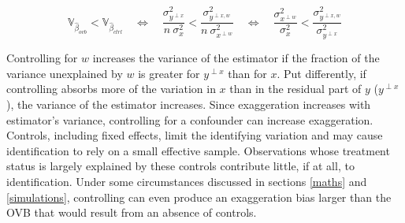 			\[
				\mathbb{V}_{\hat{\beta}_{ovb}} <  \mathbb{V}_{\hat{\beta}_{ctrl}}
                   		\quad \Leftrightarrow \quad 
				\dfrac{\sigma^{2}_{y^{\perp x}}}{n \ \sigma_{x}^{2}} < \dfrac{\sigma^{2}_{y^{\perp x, w}}}{n \ \sigma_{x^{\perp w}}^{2}}
				\quad \Leftrightarrow \quad 
				\dfrac{\sigma^{2}_{x^{\perp w}}}{\sigma_{x}^{2}} <
				\dfrac{\sigma^{2}_{y^{\perp x, w}}}{ \sigma_{y^{\perp x}}^{2}}
			\]
			
			Controlling for $w$ increases the variance of the estimator if the fraction of the variance unexplained by $w$ is greater for $y^{\perp x}$ than for $x$. Put differently, if controlling absorbs more of the variation in $x$ than in the residual part of $y$ ($y^{\perp x}$), the variance of the estimator increases. Since exaggeration increases with estimator's variance, controlling for a confounder can increase exaggeration. Controls, including fixed effects, limit the identifying variation and may cause identification to rely on a small effective sample. Observations whose treatment status is largely explained by these controls contribute little, if at all, to identification. Under some circumstances discussed in sections \ref{maths} and \ref{simulations}, controlling can even produce an exaggeration bias larger than the OVB that would result from an absence of controls. 
			
